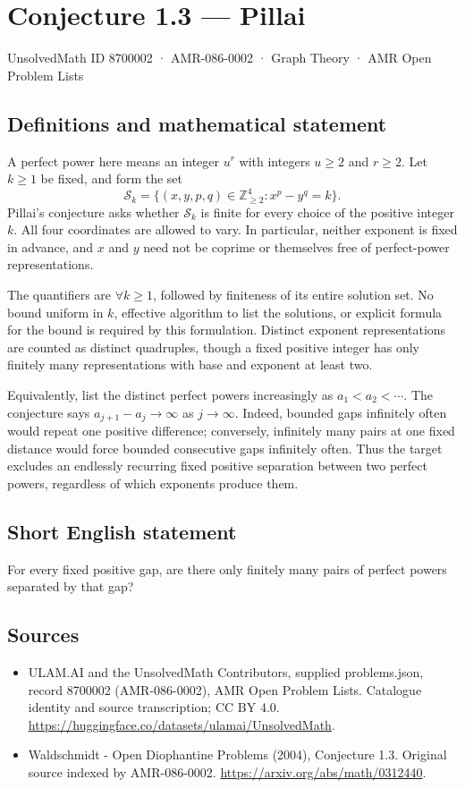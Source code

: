 \documentclass[11pt,a4paper]{article}
\begin{document}
\section*{Conjecture 1.3 — Pillai}\label{8700002}
{\small UnsolvedMath ID 8700002 · AMR-086-0002 · Graph Theory · AMR Open Problem Lists}
\subsection{Definitions and mathematical statement}
A perfect power here means an integer $u^r$ with integers $u\ge2$ and $r\ge2$. Let $k\ge1$ be fixed, and form the set
\[
\mathcal S_k=\{(x,y,p,q)\in\mathbb Z_{\ge2}^4:x^p-y^q=k\}.
\]
Pillai's conjecture asks whether $\mathcal S_k$ is finite for every choice of the positive integer $k$. All four coordinates are allowed to vary. In particular, neither exponent is fixed in advance, and $x$ and $y$ need not be coprime or themselves free of perfect-power representations.

The quantifiers are $\forall k\ge1$, followed by finiteness of its entire solution set. No bound uniform in $k$, effective algorithm to list the solutions, or explicit formula for the bound is required by this formulation. Distinct exponent representations are counted as distinct quadruples, though a fixed positive integer has only finitely many representations with base and exponent at least two.

Equivalently, list the distinct perfect powers increasingly as $a_1<a_2<\cdots$. The conjecture says $a_{j+1}-a_j\to\infty$ as $j\to\infty$. Indeed, bounded gaps infinitely often would repeat one positive difference; conversely, infinitely many pairs at one fixed distance would force bounded consecutive gaps infinitely often. Thus the target excludes an endlessly recurring fixed positive separation between two perfect powers, regardless of which exponents produce them.
\subsection{Short English statement}
For every fixed positive gap, are there only finitely many pairs of perfect powers separated by that gap?
\subsection{Sources}
\begin{itemize}
\item[S1] ULAM.AI and the UnsolvedMath Contributors, supplied problems.json, record 8700002 (AMR-086-0002), AMR Open Problem Lists. Catalogue identity and source transcription; CC BY 4.0.
\url{https://huggingface.co/datasets/ulamai/UnsolvedMath}.
\item[S2] Waldschmidt - Open Diophantine Problems (2004), Conjecture 1.3. Original source indexed by AMR-086-0002.
\url{https://arxiv.org/abs/math/0312440}.
\end{itemize}
\end{document}
